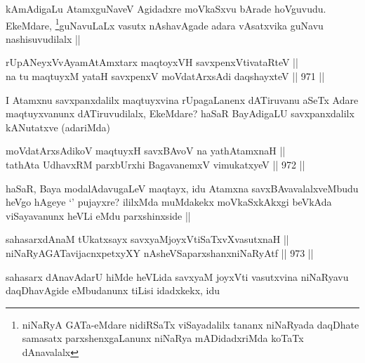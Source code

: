 \begin{artha}
kAmAdigaLu AtamxguNaveV Agidadxre moVkaSxvu bArade hoVguvudu. EkeMdare, \footnote{niNaRyA GATa-eMdare nidiRSaTx viSayadalilx tananx niNaRyada daqDhate samasatx parxshenxgaLanunx niNaRya mADidadxriMda koTaTx dAnavalalx}guNavuLaLx vasutx nAshavAgade adara vAsatxvika guNavu nashisuvudilalx ||
\end{artha}


\begin{shl}
rUpANeyxVvAyamAtAmx\s tarx maqtoyxVH savxpenxV\s tivataRteV || \\
na tu maqtuyxM yataH savxpenxV moVdatArxsAdi daqshayxteV ||  971 ||  
\end{shl}

\begin{artha}
I Atamxnu savxpanxdalilx maqtuyxvina rUpagaLanenx dATiruvanu aSeTx Adare maqtuyxvanunx dATiruvudilalx, EkeMdare? haSaR BayAdigaLU savxpanxdalilx kANutatxve (adariMda)
\end{artha}


\begin{shl}
moVdatArxsAdikoV maqtuyxH savxBAvoV na yathA\s \s tamxnaH || \\
tathA\s ta UdhavxRM parxbUrxhi BagavanemxV vimukatxyeV ||  972 ||  
\end{shl}

\begin{artha}
haSaR, Baya modalAdavugaLeV maqtayx, idu Atamxna savxBAvavalalxveMbudu heVgo hAgeye `\stext' pujayxre? ililxMda muMdakekx moVkaSxkAkxgi beVkAda viSayavanunx heVLi eMdu parxshinxside ||
\end{artha}


\begin{shl}
sahasarxdAnaM tUkatxsayx savxyaMjoyxVtiSaTxvXvasutxnaH ||  \\
niNaRyAGATavijacnxpetxyXY nAsheVSaparxshanxniNaRyAtf ||  973 ||  
\end{shl}

\begin{artha}
sahasarx dAnavAdarU hiMde heVLida savxyaM joyxVti vasutxvina niNaRyavu daqDhavAgide eMbudanunx tiLisi idadxkekx, idu
\end{artha}

